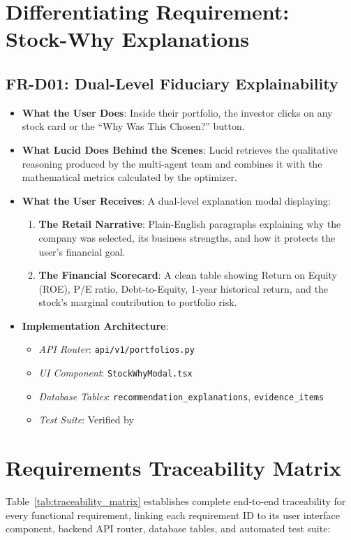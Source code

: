 \section{Differentiating Requirement: Stock-Why Explanations}

\subsection{FR-D01: Dual-Level Fiduciary Explainability}
\begin{itemize}
    \item \textbf{What the User Does}: Inside their portfolio, the investor clicks on any stock card or the ``Why Was This Chosen?'' button.
    \item \textbf{What Lucid Does Behind the Scenes}: Lucid retrieves the qualitative reasoning produced by the multi-agent team and combines it with the mathematical metrics calculated by the optimizer.
    \item \textbf{What the User Receives}: A dual-level explanation modal displaying:
    \begin{enumerate}
        \item \textbf{The Retail Narrative}: Plain-English paragraphs explaining why the company was selected, its business strengths, and how it protects the user's financial goal.
        \item \textbf{The Financial Scorecard}: A clean table showing Return on Equity (ROE), P/E ratio, Debt-to-Equity, 1-year historical return, and the stock's marginal contribution to portfolio risk.
    \end{enumerate}
    \item \textbf{Implementation Architecture}:
    \begin{itemize}
        \item \textit{API Router}: \texttt{api/v1/portfolios.py}
        \item \textit{UI Component}: \texttt{StockWhyModal.tsx}
        \item \textit{Database Tables}: \texttt{recommendation\_explanations}, \texttt{evidence\_items}
        \item \textit{Test Suite}: Verified by 
    \end{itemize}
\end{itemize}

\clearpage
\section{Requirements Traceability Matrix}
Table~\ref{tab:traceability_matrix} establishes complete end-to-end traceability for every functional requirement, linking each requirement ID to its user interface component, backend API router, database tables, and automated test suite:

